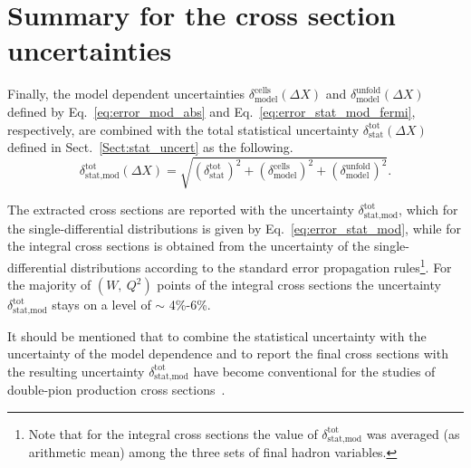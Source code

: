 \section{Summary for the cross section uncertainties}
\label{Sect:uncert_resume}


Finally, the model dependent uncertainties $\delta^{\text{cells}}_{\text{model}}(\Delta X)$ and $\delta^{\text{unfold}}_{\text{model}}(\Delta X)$ defined by Eq.~\eqref{eq:error_mod_abs} and Eq.~\eqref{eq:error_stat_mod_fermi}, respectively, are combined with the total statistical uncertainty $\delta_{\text{stat}}^{\text{tot}}(\Delta X)$ defined in Sect.~\ref{Sect:stat_uncert} as the following.
\begin{equation}
\delta_{\text{stat,mod}}^{\text{tot}} (\Delta X) =
\sqrt{\left (\delta_{\text{stat}}^{\text{tot}} \right )^{2} + \left (\delta^{\text{cells}}_{\text{model}}\right )^{2} + \left (\delta^{\text{unfold}}_{\text{model}}\right )^{2}}.
\label{eq:error_stat_mod}
\end{equation}


The extracted cross sections are reported with the uncertainty $\delta_{\text{stat,mod}}^{\text{tot}}$, which for the single-differential distributions is given by Eq.~\eqref{eq:error_stat_mod}, while for the integral cross sections is obtained from the uncertainty of the single-differential distributions according to the standard error propagation rules\footnote[6]{Note that for the integral cross sections the value of $\delta_{\text{stat,mod}}^{\text{tot}}$ was averaged (as arithmetic mean) among the three sets of final hadron variables.}. For the majority of $(W,~Q^{2})$ points of the integral cross sections the uncertainty $\delta_{\text{stat,mod}}^{\text{tot}}$ stays on a level of $\sim$ 4\%-6\%.




It should be mentioned that to combine the statistical uncertainty with the uncertainty of the model dependence and to report the final cross sections with the resulting uncertainty $\delta_{\text{stat,mod}}^{\text{tot}}$ have become conventional for the studies of double-pion production cross sections~\cite{Rip_an_note:2002,Ripani:2002ss,Fed_an_note:2007,Fedotov:2008aa,Isupov:2017lnd,Arjun,Fed_an_note:2017,Fed_paper_2018}.




